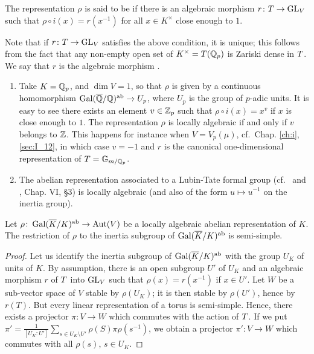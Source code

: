 \begin{mydef}
The representation $\rho$ is said to be  if there is
an algebraic morphism $r \colon T \to \operatorname{GL}_V$ such that $\rho \circ i(x) =
r(x^{-1})$ for all $x \in K^\times$ close enough to $1$. 
\end{mydef}

Note that if $r \colon T \to \operatorname{GL}_V$ satisfies the above condition, it is
unique; this follows from the fact that any non-empty open set of $K^\times =
T(\mathbb{Q}_p)$ is Zariski dense in $T$. We say that $r$ is the algebraic morphism
.

\begin{ex}
	\begin{enumerate}[wide]
\item Take $K = \mathbb{Q}_p$, and $\dim V = 1$, so that $\rho$ is given by a
	continuous homomorphism $\operatorname{Gal}(\overline{\mathbb{Q}}/\mathbb{Q})^{\mathrm{ab}} \to U_p$, where
	$U_p$ is the group of $p$-adic units. It is easy to see there exists an
	element $v \in \mathbb{Z}_p$ such that $\rho \circ i (x) = x^v$ if $x$ is close
	enough to $1$. The representation $\rho$ is locally algebraic if and
	only if $v$ belongs to $\mathbb{Z}$.  This happens for instance when $V =
	V_p(\mu)$, cf.\ Chap. \ref{ch:i}, \ref{sec:I_12}, in which case $v = -1$
	and $r$ is the canonical one-dimensional representation of $T =
	\mathbb{G}_{m/\mathbb{Q}_p}$. 
\item The abelian representation associated to a Lubin-Tate formal group
	\dpage
	(cf.\ \cite{17} and \cite{6}, Chap. VI, \S 3) is locally algebraic (and
	also of the form $u \mapsto u^{-1}$ on the inertia group).  
\end{enumerate}
\end{ex}

\begin{prop}
	Let $\rho \colon \operatorname{Gal}(\overline{K}/K)^{\mathrm{ab}} \to \operatorname{Aut}(V)$ be a locally
	algebraic abelian representation of $K$. The restriction of $\rho$ to
	the inertia subgroup of $\operatorname{Gal}(\overline{K}/K)^{\mathrm{ab}}$ is semi-simple.
\end{prop}
\begin{proof}
Let us identify the inertia subgroup of $\operatorname{Gal}(\overline{K}/K)^{\mathrm{ab}}$ with the
group $U_K$ of units of $K$.
By assumption, there is an open subgroup $U'$ of $U_K$ and an algebraic morphism
$r$ of $T$ into $\operatorname{GL}_V$ such that $\rho(x) = r (x^{-1})$ if $x \in U'$.
Let $W$ be a sub-vector space of $V$ stable by $\rho(U_K)$; it is then stable by
$\rho(U')$, hence by $r(T)$. But every linear representation of a torus is
semi-simple. Hence, there exists a projector $\pi \colon V \to W$ which commutes
with the action of $T$. If we put $\pi' = \frac{1}{[U_K:U']}\sum_{s \in U_K
\setminus U'} \rho(S) \pi \rho(s^{-1})$,
we obtain a projector $\pi' \colon V \to W$ which commutes with all $\rho(s)$,
$s \in U_K$. 
\end{proof}

